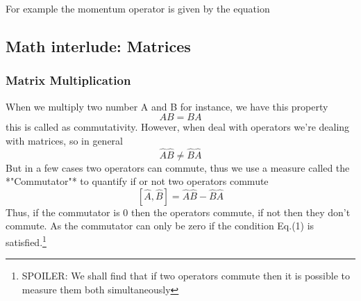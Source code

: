 \documentclass[]{article}
\begin{document}
For example the momentum operator is given by the equation


\subsection{Math interlude: Matrices}

\subsubsection{Matrix Multiplication}

When we multiply two number A and B for instance, we have this property
$$AB = BA$$
this is called as commutativity. However, when deal with operators we're dealing with matrices, so in general
$$\hat{A}\hat{B} \neq \hat{B}\hat{A}$$
But in a few cases two operators can commute, thus we use a measure called the *"Commutator"* to quantify if or not two operators commute
$$[\hat{A}, \hat{B}] = \hat{A}\hat{B} - \hat{B}\hat{A}$$
Thus, if the commutator is 0 then the operators commute, if not then they don't commute. As the commutator can only be zero if the condition Eq.(1) is satisfied.\footnote{SPOILER: We shall find that if two operators commute then it is possible to measure them both simultaneously}




\end{document}
